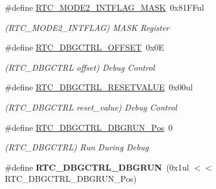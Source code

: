 \begin{DoxyCompactItemize}
\item 
\hypertarget{group___s_a_m_l21___r_t_c_ga4186cafd7b84e53d68eeebc4c03d9cc8}{}\#define \hyperlink{group___s_a_m_l21___r_t_c_ga4186cafd7b84e53d68eeebc4c03d9cc8}{R\+T\+C\+\_\+\+M\+O\+D\+E2\+\_\+\+I\+N\+T\+F\+L\+A\+G\+\_\+\+M\+A\+S\+K}~0x81\+F\+Ful\label{group___s_a_m_l21___r_t_c_ga4186cafd7b84e53d68eeebc4c03d9cc8}

\begin{DoxyCompactList}\small\item\em (R\+T\+C\+\_\+\+M\+O\+D\+E2\+\_\+\+I\+N\+T\+F\+L\+A\+G) M\+A\+S\+K Register \end{DoxyCompactList}\item 
\hypertarget{group___s_a_m_l21___r_t_c_gaac74425380ba21315855439dc4408e4e}{}\#define \hyperlink{group___s_a_m_l21___r_t_c_gaac74425380ba21315855439dc4408e4e}{R\+T\+C\+\_\+\+D\+B\+G\+C\+T\+R\+L\+\_\+\+O\+F\+F\+S\+E\+T}~0x0\+E\label{group___s_a_m_l21___r_t_c_gaac74425380ba21315855439dc4408e4e}

\begin{DoxyCompactList}\small\item\em (R\+T\+C\+\_\+\+D\+B\+G\+C\+T\+R\+L offset) Debug Control \end{DoxyCompactList}\item 
\hypertarget{group___s_a_m_l21___r_t_c_ga19592154d271f8871d1a9443362a37ee}{}\#define \hyperlink{group___s_a_m_l21___r_t_c_ga19592154d271f8871d1a9443362a37ee}{R\+T\+C\+\_\+\+D\+B\+G\+C\+T\+R\+L\+\_\+\+R\+E\+S\+E\+T\+V\+A\+L\+U\+E}~0x00ul\label{group___s_a_m_l21___r_t_c_ga19592154d271f8871d1a9443362a37ee}

\begin{DoxyCompactList}\small\item\em (R\+T\+C\+\_\+\+D\+B\+G\+C\+T\+R\+L reset\+\_\+value) Debug Control \end{DoxyCompactList}\item 
\hypertarget{group___s_a_m_l21___r_t_c_ga29f5905ec4807d8d5cafd4d5c29f1c80}{}\#define \hyperlink{group___s_a_m_l21___r_t_c_ga29f5905ec4807d8d5cafd4d5c29f1c80}{R\+T\+C\+\_\+\+D\+B\+G\+C\+T\+R\+L\+\_\+\+D\+B\+G\+R\+U\+N\+\_\+\+Pos}~0\label{group___s_a_m_l21___r_t_c_ga29f5905ec4807d8d5cafd4d5c29f1c80}

\begin{DoxyCompactList}\small\item\em (R\+T\+C\+\_\+\+D\+B\+G\+C\+T\+R\+L) Run During Debug \end{DoxyCompactList}\item 
\hypertarget{group___s_a_m_l21___r_t_c_gaac213e71aaf52cf077a6027daa6eec9e}{}\#define {\bfseries R\+T\+C\+\_\+\+D\+B\+G\+C\+T\+R\+L\+\_\+\+D\+B\+G\+R\+U\+N}~(0x1ul $<$$<$ R\+T\+C\+\_\+\+D\+B\+G\+C\+T\+R\+L\+\_\+\+D\+B\+G\+R\+U\+N\+\_\+\+Pos)\label{group___s_a_m_l21___r_t_c_gaac213e71aaf52cf077a6027daa6eec9e}


\end{DoxyCompactItemize}
